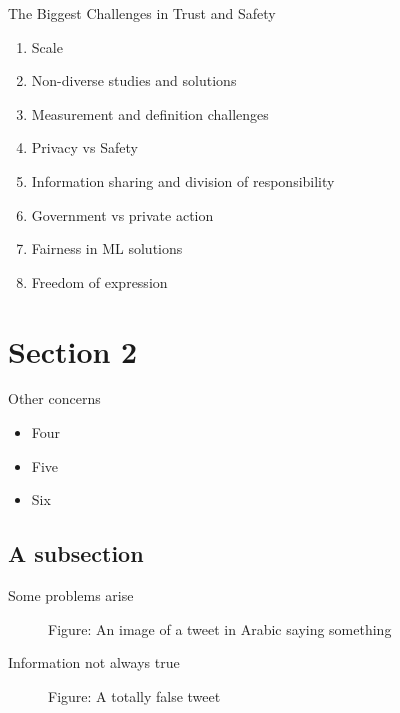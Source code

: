 \documentclass[nobackground,dvipsnames,table]{beamer}
\begin{document}

\begin{frame}{The Biggest Challenges in Trust and Safety}
    \begin{enumerate}
        \item Scale
        \item Non-diverse studies and solutions
        \item Measurement and definition challenges
        \item Privacy vs Safety
        \item Information sharing and division of responsibility
        \item Government vs private action
        \item Fairness in ML solutions
        \item Freedom of expression
    \end{enumerate}
\end{frame}



\section{Section 2}

\begin{frame}{Other concerns}
    \begin{itemize}
        \item Four
        \item Five
        \item Six
    \end{itemize}
\end{frame}

\subsection{A subsection}

\begin{frame}{Some problems arise}
    \begin{figure}[ht]
        \center
        {Figure: An image of a tweet in Arabic saying something}
    \end{figure}
\end{frame}

\begin{frame}{Information not always true }
    \begin{figure}[ht]
        \center
        {Figure: A totally false tweet}
    \end{figure}
\end{frame}
\end{document}
